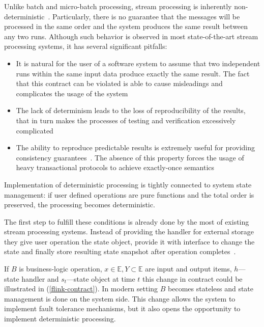 
\label{motivation-section}

Unlike batch and micro-batch processing, stream processing is inherently non-deterministic~\cite{Zaharia:2012:DSE:2342763.2342773}. Particularly, there is no guarantee that the messages will be processed in the same order and the system produces the same result between any two runs. Although such behavior is observed in most state-of-the-art stream processing systems, it has several significant pitfalls:

\begin{itemize}
    \item It is natural for the user of a software system to assume that two independent runs within the same input data produce exactly the same result. The fact that this contract can be violated is able to cause misleadings and complicates the usage of the system
    \item The lack of determinism leads to the loss of reproducibility of the results, that in turn makes the processes of testing and verification excessively complicated
    \item The ability to reproduce predictable results is extremely useful for providing consistency guarantees~\cite{Stonebraker:2005:RRS:1107499.1107504}. The absence of this property forces the usage of heavy transactional protocols to achieve exactly-once semantics~\cite{Carbone:2017:SMA:3137765.3137777, jacques2016consistent}
\end{itemize}

Implementation of deterministic processing is tightly connected to system state management: if user defined operations are pure functions and the total order is preserved, the processing becomes deterministic.

The first step to fulfill these conditions is already done by the most of existing stream processing systems. Instead of providing the handler for external storage they give user operation the state object, provide it with interface to change the state and finally store resulting state snapshot after operation completes~\cite{carbone2015apache, apache:storm, Noghabi:2017:SSS:3137765.3137770}.

If $B$ is business-logic operation, $x \in \mathbb{E}, Y \subset \mathbb{E}$ are input and output items, $h$---state handler and $s_t$---state object at time $t$ this change in contract could be illustrated in (\ref{flink-contract}). In modern setting $B$ becomes stateless and state management is done on the system side. This change allows the system to implement fault tolerance mechanisms, but it also opens the opportunity to implement deterministic processing.

